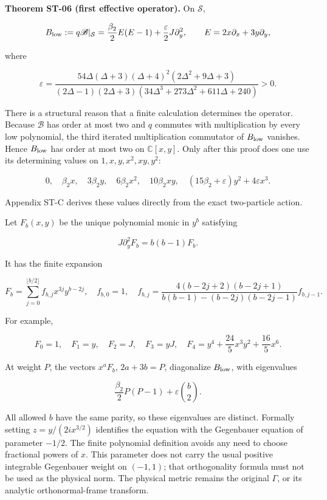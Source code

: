 \documentclass[a4paper,11pt]{article}
\numberwithin{equation}{section}
\begin{document}
\textbf{Theorem ST-06 (first effective operator).} On \(\mathcal S\),

\[
B_{\rm low}:=q\mathscr B|_{\mathcal S}
=\frac{\beta_2}{2}E(E-1)+\frac{\varepsilon}{2}J\partial_y^2,
\qquad E=2x\partial_x+3y\partial_y,
\]

where

\[
\varepsilon=
\frac{54\Delta(\Delta+3)(\Delta+4)^2(2\Delta^2+9\Delta+3)}
{(2\Delta-1)(2\Delta+3)(34\Delta^3+273\Delta^2+611\Delta+240)}>0.
\]

There is a structural reason that a finite calculation determines the operator. Because \(\mathscr B\) has order at most two and \(q\) commutes with multiplication by every low polynomial, the third iterated multiplication commutator of \(B_{\rm low}\) vanishes. Hence \(B_{\rm low}\) has order at most two on \(\mathbb C[x,y]\). Only after this proof does one use its determining values on \(1,x,y,x^2,xy,y^2\):

\[
0,\quad\beta_2x,\quad3\beta_2y,\quad
6\beta_2x^2,\quad10\beta_2xy,\quad
(15\beta_2+\varepsilon)y^2+4\varepsilon x^3.
\]

Appendix ST-C derives these values directly from the exact two-particle action.

Let \(F_b(x,y)\) be the unique polynomial monic in \(y^b\) satisfying

\[
J\partial_y^2F_b=b(b-1)F_b.
\]

It has the finite expansion

\[
F_b=\sum_{j=0}^{\lfloor b/2\rfloor}f_{b,j}x^{3j}y^{b-2j},
\quad f_{b,0}=1,\quad
f_{b,j}=
\frac{4(b-2j+2)(b-2j+1)}
{b(b-1)-(b-2j)(b-2j-1)}f_{b,j-1}.
\]

For example,

\[
F_0=1,\quad F_1=y,\quad F_2=J,\quad F_3=yJ,\quad
F_4=y^4+\frac{24}{5}x^3y^2+\frac{16}{5}x^6.
\]

At weight \(P\), the vectors \(x^aF_b\), \(2a+3b=P\), diagonalize \(B_{\rm low}\), with eigenvalues

\[
\frac{\beta_2}{2}P(P-1)+\varepsilon\binom b2.
\]

All allowed \(b\) have the same parity, so these eigenvalues are distinct. Formally setting \(z=y/(2i x^{3/2})\) identifies the equation with the Gegenbauer equation of parameter \textbf{\(-1/2\)}. The finite polynomial definition avoids any need to choose fractional powers of \(x\). This parameter does not carry the usual positive integrable Gegenbauer weight on \((-1,1)\); that orthogonality formula must not be used as the physical norm. The physical metric remains the original \(\Gamma\), or its analytic orthonormal-frame transform.
\end{document}
